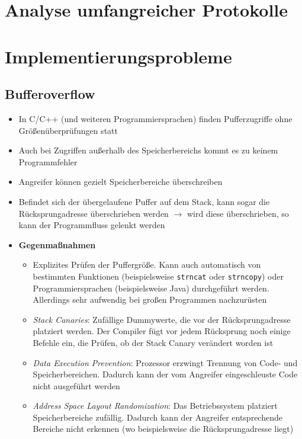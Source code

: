 \section{Analyse umfangreicher Protokolle}



\section{Implementierungsprobleme}

\subsection{Bufferoverflow}
\begin{itemize}
	\item In C/C++ (und weiteren Programmiersprachen) finden Pufferzugriffe ohne Größenüberprüfungen statt
	\item Auch bei Zugriffen außerhalb des Speicherbereichs kommt es zu keinem Programmfehler
	\item Angreifer können gezielt Speicherbereiche überschreiben
	\item Befindet sich der übergelaufene Puffer auf dem Stack, kann sogar die Rücksprungadresse überschrieben werden \(\rightarrow\) wird diese überschrieben, so kann der Programmfluss gelenkt werden
	\item \textbf{Gegenmaßnahmen}
	\begin{itemize}
		\item Explizites Prüfen der Puffergröße. Kann auch automatisch von bestimmten Funktionen (beispielsweise \texttt{strncat} oder \texttt{strncopy}) oder Programmiersprachen (beispielsweise Java) durchgeführt werden. Allerdings sehr aufwendig bei großen Programmen nachzurüsten
		\item \textit{Stack Canaries}: Zufällige Dummywerte, die vor der Rücksprungadresse platziert werden. Der Compiler fügt vor jedem Rücksprung noch einige Befehle ein, die Prüfen, ob der Stack Canary verändert worden ist
		\item \textit{Data Execution Prevention}: Prozessor erzwingt Trennung von Code- und Speicherbereichen. Dadurch kann der vom Angreifer eingeschleuste Code nicht ausgeführt werden
		\item \textit{Address Space Layout Randomization}: Das Betriebssystem platziert Speicherbereiche zufällig. Dadurch kann der Angreifer entsprechende Bereiche nicht erkennen (wo beispielsweise die Rücksprungadresse liegt)
	\end{itemize}
\end{itemize}



